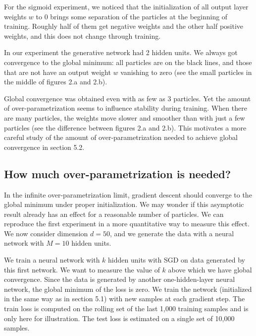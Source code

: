 \documentclass[a4paper, 11pt]{scrartcl}
\begin{document}
{For the sigmoid experiment, we noticed that the initialization of all output layer weights $w$ to 0 brings some separation of the particles at the beginning of training. Roughly half of them get negative weights and the other half positive weights, and this does not change through training.

In our experiment the generative network had 2 hidden units. We always got convergence to the global minimum: all particles are on the black lines, and those that are not have an output weight $w$ vanishing to zero (see the small particles in the middle of figures 2.a and 2.b).


Global convergence was obtained even with as few as 3 particles. Yet the amount of over-parametrization seems to influence stability during training. When there are many particles, the weights move slower and smoother than with just a few particles (see the difference between figures 2.a and 2.b). This motivates a more careful study of the amount of over-parametrization needed to achieve global convergence in section 5.2.

\subsection{How much over-parametrization is needed?}

In the infinite over-parametrization limit, gradient descent should converge to the global minimum under proper initialization. We may wonder if this asymptotic result already has an effect for a reasonable number of particles. We can reproduce the first experiment in a more quantitative way to measure this effect. We now consider dimension $d=50$, and we generate the data with a neural network with $M=10$ hidden units.

We train a neural network with $k$ hidden units with SGD on data generated by this first network. We want to measure the value of $k$ above which we have global convergence. Since the data is generated by another one-hidden-layer neural network, the global minimum of the loss is zero. We train the network (initialized in the same way as in section 5.1) with new samples at each gradient step. The train loss is computed on the rolling set of the last 1,000 training samples and is only here for illustration. The test loss is estimated on a single set of 10,000 samples.


}
\end{document}
